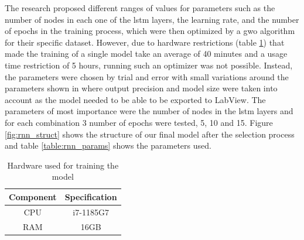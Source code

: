 The research \cite{RNNEMG} proposed different ranges of values for parameters such as the number of nodes in each one of the \acrshort{lstm} 
layers, the learning rate, and the number of epochs in the training process, which were then optimized by a \acrfull{gwo} 
algorithm for their specific dataset. However, due to hardware restrictions (table \ref{table:hardware}) that made the training of a 
single model take an average of 40 minutes and a usage time restriction of 5 hours, running such an optimizer was not possible. Instead, 
the parameters were chosen by trial and error with small variations around the parameters shown in \cite{RNNEMG} where output precision and 
model size were taken into account as the model needed to be able to be exported to LabView.
The parameters of most importance were the number of nodes in the \acrshort{lstm} layers and for each combination 3 number of epochs were
tested, 5, 10 and 15.
Figure \ref{fig:rnn_struct} shows the structure of our final model after the selection process and table \ref{table:rnn_params} shows the parameters used.

\begin{table}[h]
    \centering
    \caption{Hardware used for training the model}
    \label{table:hardware}
    \begin{tabular}{|c|c|}
        \hline
        \textbf{Component} & \textbf{Specification} \\ \hline
        CPU & i7-1185G7 \\ \hline
        RAM & 16GB \\ \hline
    \end{tabular}
\end{table}

